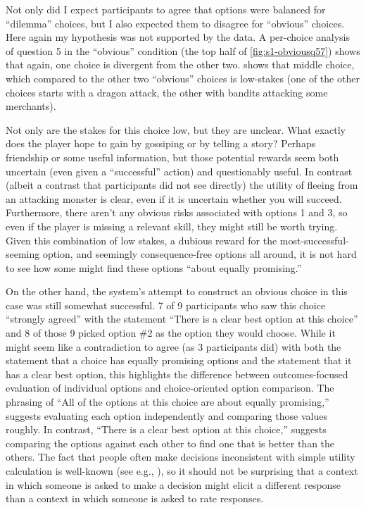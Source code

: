 Not only did I expect participants to agree that options were balanced for ``dilemma'' choices, but I also expected them to disagree for ``obvious'' choices.
%
Here again my hypothesis was not supported by the data.
%
A per-choice analysis of question 5 in the ``obvious'' condition (the top half of \cref{fig:s1-obviousq57}) shows that again, one choice is divergent from the other two.
%
 shows that middle choice, which compared to the other two ``obvious'' choices is low-stakes (one of the other choices starts with a dragon attack, the other with bandits attacking some merchants).



Not only are the stakes for this choice low, but they are unclear.
%
What exactly does the player hope to gain by gossiping or by telling a story?
%
Perhaps friendship or some useful information, but those potential rewards seem both uncertain (even given a ``successful'' action) and questionably useful.
%
In contrast (albeit a contrast that participants did not see directly) the utility of fleeing from an attacking monster is clear, even if it is uncertain whether you will succeed.
%
Furthermore, there aren't any obvious risks associated with options 1 and 3, so even if the player is missing a relevant skill, they might still be worth trying.
%
Given this combination of low stakes, a dubious reward for the most-successful-seeming option, and seemingly consequence-free options all around, it is not hard to see how some might find these options ``about equally promising.''


On the other hand, the system's attempt to construct an obvious choice in this case was still somewhat successful.
%
7 of 9 participants who saw this choice ``strongly agreed'' with the statement ``There is a clear best option at this choice'' and 8 of those 9 picked option \#2 as the option they would choose.
%
While it might seem like a contradiction to agree (as 3 participants did) with both the statement that a choice has equally promising options and the statement that it has a clear best option, this highlights the difference between outcomes-focused evaluation of individual options and choice-oriented option comparison.
%
The phrasing of ``All of the options at this choice are about equally promising,'' suggests evaluating each option independently and comparing those values roughly.
%
In contrast, ``There is a clear best option at this choice,'' suggests comparing the options against each other to find one that is better than the others.
%
The fact that people often make decisions inconsistent with simple utility calculation is well-known (see e.g., \citep{Tversky1993}), so it should not be surprising that a context in which someone is asked to make a decision might elicit a different response than a context in which someone is asked to rate responses.



